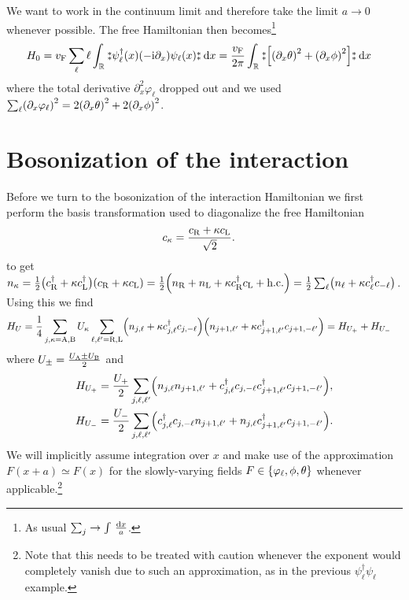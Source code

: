 \documentclass[english, parskip=full]{scrartcl}
\begin{document}
We want to work in the continuum limit and therefore take the limit $a\rightarrow 0$ whenever possible.
The free Hamiltonian then becomes\footnote{As usual $\sum_j \rightarrow \int \,\frac{\d x}{a}$.}
\begin{align}
H_0 &= \vf\sum_\ell \ell \intr{\varnormord{\psi_\ell^\dagger(x) (-\i\partial_x) \psi_\ell(x)}}{x} = \frac{\vf}{2\pi} \intr{\varnormord{\klb*{\kla*{\partial_x\theta}^2 + \kla*{\partial_x\phi}^2}} }{x}
\end{align}
where the total derivative $\partial_x^2\varphi_\ell$ dropped out and we used $\sum_\ell \kla*{\partial_x\varphi_\ell}^2 = 2 \kla*{\partial_x\theta}^2 + 2\kla*{\partial_x\phi}^2$.
\section{Bosonization of the interaction}
Before we turn to the bosonization of the interaction Hamiltonian we first perform the basis transformation used to diagonalize the free Hamiltonian
\begin{align}
c_\kappa &= \frac{c_\R + \kappa c_\L}{\sqrt{2}}.
\end{align}
to get $n_\kappa = \frac{1}{2} \kla[\big]{c_\R^\dagger + \kappa c_\L^\dagger} \kla*{c_\R + \kappa c_\L} = \frac{1}{2} \kla*{n_\R + n_\L + \kappa c_\R^\dagger c_\L + \hc} = \frac{1}{2} \sum_\ell \kla[\big]{n_\ell + \kappa c_\ell^\dagger c_{-\ell}}$. 
Using this we find
\begin{align}
H_U &= \frac{1}{4} \sum_{j,\kappa=\A,\B} U_\kappa \sum_{\ell,\ell' = \R,\L} \kla*{n_{j,\ell} + \kappa c_{j,\ell}^\dagger c_{j,-\ell}} \kla*{n_{j+1,\ell'} + \kappa c_{j+1,\ell'}^\dagger c_{j+1,-\ell'}} = H_{U_+} +  H_{U_-}
\end{align}
where $U_\pm = \frac{U_\A \pm U_\B}{2}$ and
\begin{align}
H_{U_+} &= \frac{U_+}{2} \sum_{j,\ell,\ell'} \kla*{n_{j,\ell} n_{j+1,\ell'} + c_{j,\ell}^\dagger c_{j,-\ell} c_{j+1,\ell'}^\dagger c_{j+1,-\ell'}},\\
H_{U_-} &= \frac{U_-}{2} \sum_{j,\ell,\ell'} \kla*{c_{j,\ell}^\dagger c_{j,-\ell} n_{j+1,\ell'} + n_{j,\ell} c_{j+1,\ell'}^\dagger c_{j+1,-\ell'} }.
\end{align}
We will implicitly assume integration over $x$ and make use of the approximation $F(x+a) \simeq F(x)$ for the slowly-varying fields $F\in \klc*{\varphi_\ell, \phi, \theta}$ whenever applicable.\footnote{Note that this needs to be treated with caution whenever the exponent would completely vanish due to such an approximation, as in the previous $\psi_\ell^\dagger \psi_\ell$ example.} 
\end{document}
